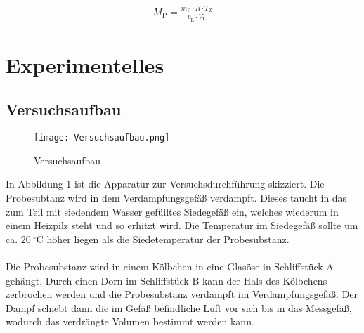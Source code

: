 \documentclass[12pt,a4paper,titlepage,headinclude,bibtotoc]{scrartcl}
\begin{document}
\begin{align}
M_{\mathrm{P}} = \frac{m_{\mathrm{P}}\cdot R \cdot T_{\mathrm{Z}}}{p_{\mathrm{L}} \cdot V_{\mathrm{L}}}
\end{align}

\section{Experimentelles}
\subsection{Versuchsaufbau}

\begin{figure} [h!]
\begin{center}
\texttt{[image: Versuchsaufbau.png]} 
\end{center}
\caption {Versuchsaufbau}
\end{figure}


In Abbildung 1 ist die Apparatur zur Versuchsdurchführung skizziert. Die Probesubtanz wird in dem Verdampfungsgefäß verdampft. Dieses taucht in das zum Teil mit siedendem Wasser gefülltes Siedegefäß ein, welches wiederum in einem Heizpilz steht und so erhitzt wird. Die Temperatur im Siedegefäß sollte um ca. $20{~} ^{\circ}$C höher liegen als die Siedetemperatur der Probesubstanz. \\\\
Die Probesubstanz wird in einem Kölbchen in eine Glasöse in Schliffstück A gehängt. Durch einen Dorn im Schliffstück B kann der Hals des Kölbchens zerbrochen werden und die Probesubstanz verdampft im Verdampfungsgefäß. Der Dampf schiebt dann die im Gefäß befindliche Luft vor sich bis in das Messgefäß, wodurch das verdrängte Volumen bestimmt werden kann.
\end{document}
